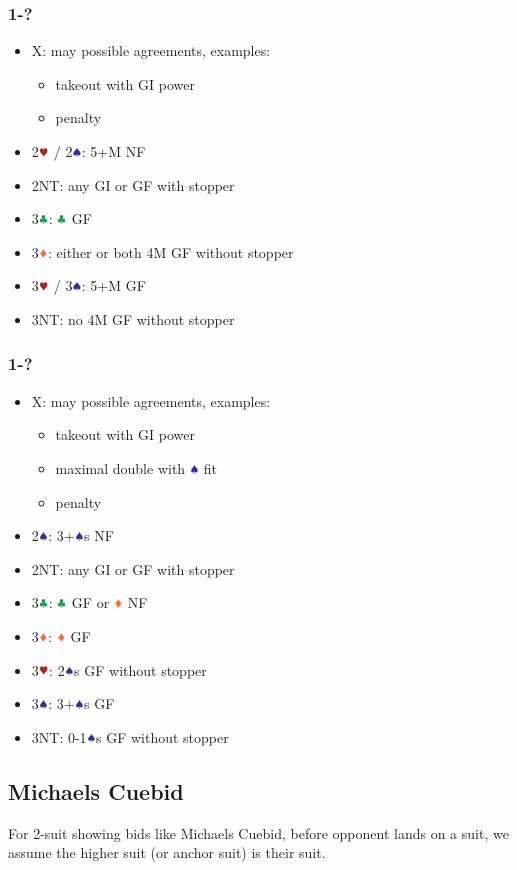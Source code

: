 \documentclass{article}
\begin{document}
\begin{multicols}{2}
\subsubsection{1\DDD-?}
\begin{itemize}
    \item X: may possible agreements, examples:
    \begin{itemize}
        \item takeout with GI power
        \item penalty
    \end{itemize}
    \item 2$\hhh$ / 2$\sss$: 5+M NF
    \item 2NT: any GI or GF with stopper
    \item 3$\ccc$: $\ccc$ GF
    \item 3$\ddd$: either or both 4M GF without stopper
    \item 3$\hhh$ / 3$\sss$: 5+M GF
    \item 3NT: no 4M GF without stopper
\end{itemize}

\subsubsection{1\HHH-?}
\begin{itemize}
    \item X: may possible agreements, examples:
    \begin{itemize}
        \item takeout with GI power
        \item maximal double with $\sss$ fit
        \item penalty
    \end{itemize}
    \item 2$\sss$: 3+$\sss$s NF
    \item 2NT: any GI or GF with stopper
    \item 3$\ccc$: $\ccc$ GF or $\ddd$ NF
    \item 3$\ddd$: $\ddd$ GF
    \item 3$\hhh$: 2$\sss$s GF without stopper
    \item 3$\sss$: 3+$\sss$s GF
    \item 3NT: 0-1$\sss$s GF without stopper
\end{itemize}

\subsection{Michaels Cuebid}
For 2-suit showing bids like Michaels Cuebid, before opponent lands on a suit, we assume the higher suit (or anchor suit) is their suit.

\end{multicols}
\end{document}
